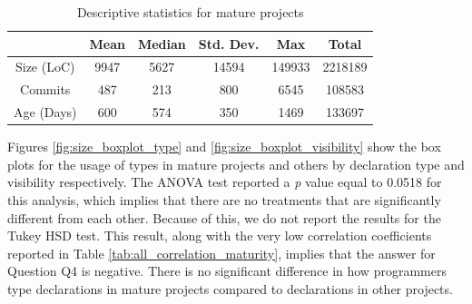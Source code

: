 \documentclass[]{sigplanconf}
\renewcommand{\arraystretch}{1.2}
\begin{document}
\begin{table}[h!]

\centering{}%
\renewcommand{\arraystretch}{1.2}
\small
\begin{tabular}{|c|c|c|c|c|c|}
\hline
{}		& Mean	& Median	& Std. Dev.	& Max	& Total		\\
\hline
\hline
Size (LoC)	& 9947 	& 5627 & 14594  & 149933	& 2218189	\\ \hline
Commits   	& 487  	& 213    & 800   & 6545		& 108583	\\ \hline
Age (Days)  & 600  	& 574  & 350   & 1469		& 133697	\\ \hline
\end{tabular}
\caption{Descriptive statistics for mature projects}
\label{tab:mature_dataset_characterization}
\end{table}

Figures \ref{fig:size_boxplot_type}  and \ref{fig:size_boxplot_visibility} show the box plots for the usage of types in mature projects and others by declaration type and visibility respectively.
The ANOVA test reported a \emph{p} value equal to 0.0518 for this analysis, which implies that there are no treatments that are significantly different from each other.
Because of this, we do not report the results for the Tukey HSD test.
This result, along with the very low correlation coefficients reported in Table \ref{tab:all_correlation_maturity}, implies that the answer for Question Q4 is negative.
There is no significant difference in how programmers type declarations in mature projects compared to declarations in other projects.
\end{document}
